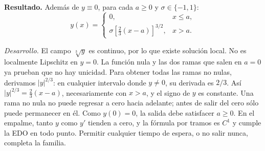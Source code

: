 \noindent\textbf{Resultado.} Además de $y\equiv0$, para cada $a\ge0$ y $\sigma\in\{-1,1\}$:
\[y(x)=\begin{cases}0,&x\le a,\\ \sigma[\tfrac23(x-a)]^{3/2},&x>a.\end{cases}\]

\noindent\textit{Desarrollo.} El campo $\sqrt[3]{y}$ es continuo, por lo que existe solución local. No es localmente Lipschitz en $y=0$. La función nula y las dos ramas que salen en $a=0$ ya prueban que no hay unicidad. Para obtener todas las ramas no nulas, derivamos $|y|^{2/3}$: en cualquier intervalo donde $y\ne0$, su derivada es $2/3$. Así $|y|^{2/3}=\frac23(x-a)$, necesariamente con $x>a$, y el signo de $y$ es constante. Una rama no nula no puede regresar a cero hacia adelante; antes de salir del cero sólo puede permanecer en él. Como $y(0)=0$, la salida debe satisfacer $a\ge0$. En el empalme, tanto $y$ como $y'$ tienden a cero, y la fórmula por tramos es $C^1$ y cumple la EDO en todo punto. Permitir cualquier tiempo de espera, o no salir nunca, completa la familia.
